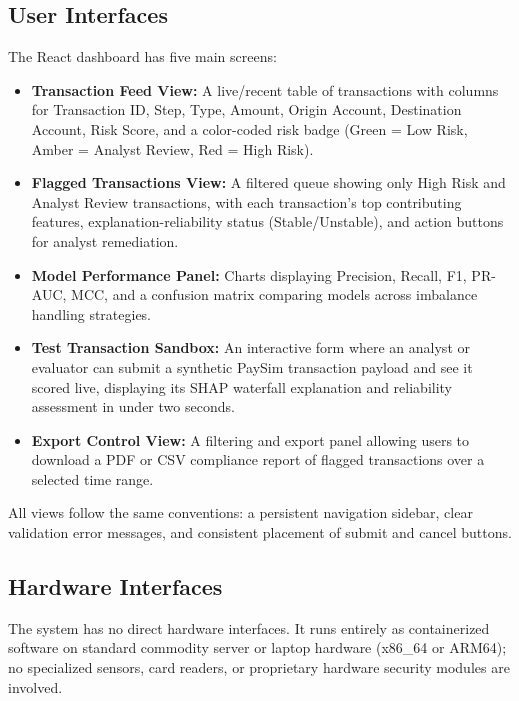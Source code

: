 \documentclass[12pt, a4paper]{report}
\begin{document}
\subsection{User Interfaces}
The React dashboard has five main screens:
\begin{itemize}
    \item \textbf{Transaction Feed View:} A live/recent table of transactions with columns for Transaction ID, Step, Type, Amount, Origin Account, Destination Account, Risk Score, and a color-coded risk badge (Green = Low Risk, Amber = Analyst Review, Red = High Risk).
    \item \textbf{Flagged Transactions View:} A filtered queue showing only High Risk and Analyst Review transactions, with each transaction's top contributing features, explanation-reliability status (Stable/Unstable), and action buttons for analyst remediation.
    \item \textbf{Model Performance Panel:} Charts displaying Precision, Recall, F1, PR-AUC, MCC, and a confusion matrix comparing models across imbalance handling strategies.
    \item \textbf{Test Transaction Sandbox:} An interactive form where an analyst or evaluator can submit a synthetic PaySim transaction payload and see it scored live, displaying its SHAP waterfall explanation and reliability assessment in under two seconds.
    \item \textbf{Export Control View:} A filtering and export panel allowing users to download a PDF or CSV compliance report of flagged transactions over a selected time range.
\end{itemize}
All views follow the same conventions: a persistent navigation sidebar, clear validation error messages, and consistent placement of submit and cancel buttons.

\subsection{Hardware Interfaces}
The system has no direct hardware interfaces. It runs entirely as containerized software on standard commodity server or laptop hardware (x86\_64 or ARM64); no specialized sensors, card readers, or proprietary hardware security modules are involved.
\end{document}

